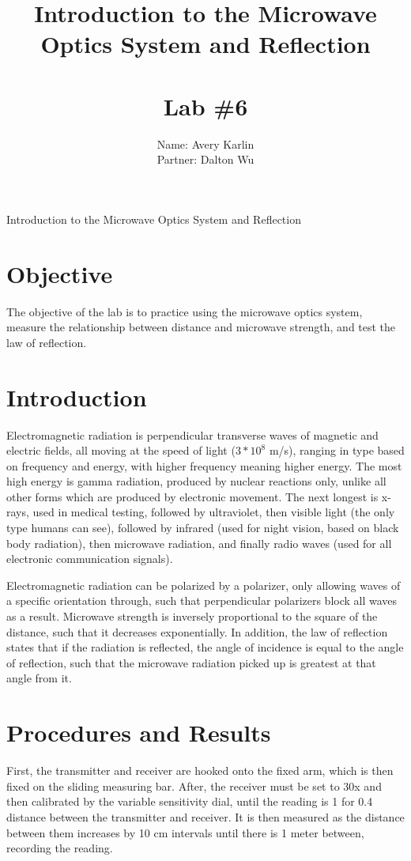 \documentclass[11pt, titlepage]{article}
\title{Introduction to the Microwave Optics System and Reflection \\ \ \\ \large Lab \#6}
\author{Name: Avery Karlin \\ Partner: Dalton Wu}
\date{}
\begin{document}
\maketitle

\begin{center}
\LARGE Introduction to the Microwave Optics System and Reflection
\end{center}

\section*{Objective}
The objective of the lab is to practice using the microwave optics system, measure the relationship between distance and microwave strength, and test the law of reflection.

\section*{Introduction}
Electromagnetic radiation is perpendicular transverse waves of magnetic and electric fields, all moving at the speed of light ($3 * 10^8$ m/s), ranging in type based on frequency and energy, with higher frequency meaning higher energy. The most high energy is gamma radiation, produced by nuclear reactions only, unlike all other forms which are produced by electronic movement. The next longest is x-rays, used in medical testing, followed by ultraviolet, then visible light (the only type humans can see), followed by infrared (used for night vision, based on black body radiation), then microwave radiation, and finally radio waves (used for all electronic communication signals).

Electromagnetic radiation can be polarized by a polarizer, only allowing waves of a specific orientation through, such that perpendicular polarizers block all waves as a result. Microwave strength is inversely proportional to the square of the distance, such that it decreases exponentially. In addition, the law of reflection states that if the radiation is reflected, the angle of incidence is equal to the angle of reflection, such that the microwave radiation picked up is greatest at that angle from it.

\section*{Procedures and Results}

First, the transmitter and receiver are hooked onto the fixed arm, which is then fixed on the sliding measuring bar. After, the receiver must be set to 30x and then calibrated by the variable sensitivity dial, until the reading is 1 for 0.4 distance between the transmitter and receiver. It is then measured as the distance between them increases by 10 cm intervals until there is 1 meter between, recording the reading. 
\end{document}
